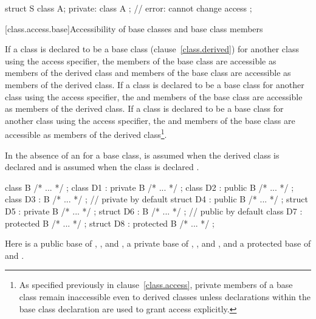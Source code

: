 \begin{codeblock}
struct S {
	class A;
private:
	class A { };		// error: cannot change access
};
\end{codeblock}
\exitexampleb

[class.access.base]{Accessibility of base classes and base class members}%
%
%
%
%

\pnum
If a class is declared to be a base class (clause~\ref{class.derived}) for another class using the
access specifier, the
members of the base class are accessible as
members of the derived class and
members of the base class are accessible as
members of the derived class.
If a class is declared to be a base class for another class using the
access specifier, the
and
members of the base class are accessible as
members of the derived class.
If a class is declared to be a base class for another class using the
access specifier, the
and
members of the base class are accessible as
members of the derived class\footnote{As specified previously in clause~\ref{class.access},
private members of a base class remain inaccessible even to derived classes
unless
declarations within the base class declaration are used to grant access explicitly.}.

\pnum
In the absence of an
for a base class,
is assumed when the derived class is declared
and
is assumed when the class is declared
.
\enterexample

\begin{codeblock}
class B { /* ... */ };
class D1 : private B { /* ... */ };
class D2 : public B { /* ... */ };
class D3 : B { /* ... */ };     //  private by default
struct D4 : public B { /* ... */ };
struct D5 : private B { /* ... */ };
struct D6 : B { /* ... */ };    //  public by default
class D7 : protected B { /* ... */ };
struct D8 : protected B { /* ... */ };
\end{codeblock}

Here
is a public base of
,
,
and
,
a private base of
,
,
and
,
and a protected base of
and
.
\exitexampleb

